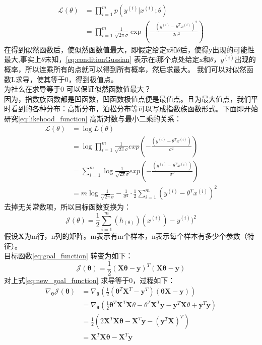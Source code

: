 \documentclass{ctexart}
\begin{document}
    \begin{align}\label{eq:likehood_function}
      \mathcal L(\theta) &= \prod_{i=1}^{m}p(y^{(i)}|x^{(i)};\theta)\\
      &=\prod_{i=1}^{m}\frac{1}{\sqrt{2\pi}{\sigma}}\exp\left(-\frac{(y^{(i)}-\theta^Tx^{(i)})^2}{2\sigma^2}\right)
    \end{align}
    在得到似然函数后，使似然函数值最大，即假定给定x和$ \theta $后，使得y出现的可能性最大,事实上$\theta $未知，\ref{eq:conditionGussian} 表示在i那个点处给定x和$\theta ，y^{(i)}$出现的概率，所以连乘所有的点就可以得到所有概率，然后求最大。 我们可以对似然函数L求导，使其等于0，得到极值点。 \\
    为社么在求导等于0 可以保证似然函数值最大？ \\
    因为，指数族函数都是凹函数，凹函数极值点便是最值点。且为最大值点，我们平时看到的各种分布：高斯分布，泊松分布等可以写成指数族函数形式。下面即开始研究\ref{eq:likehood_function} 高斯对数与最小二乘的关系： \\
    \begin{align}\label{eq:log_likehood}
      \mathcal L(\theta) & = \log L(\theta) \\
      & = \log \prod_{i=1}^{m}\frac{1}{\sqrt{2\pi}\sigma}exp\left ( -\frac{(y^{(i)}-\theta^Tx^{(i)})}{\sigma^2}\right )\\
      & = \sum_{i=1}^{m}\log \frac{1}{\sqrt{2\pi}\sigma}exp\left ( -\frac{(y^{(i)}-\theta^Tx^{(i)})}{\sigma^2}\right ) \\
      & = m\log \frac{1}{\sqrt{2\pi}\sigma}-\frac{1}{\sigma^2}\cdot\frac{1}{2}\sum_{i=1}^{m}(y^{(i)}-\theta^Tx^{(i)})^2
    \end{align}
    去掉无关常数项，所以目标函数变换为：\\
    \begin{equation}\label{eq:goal_function}
      \mathcal{J(\theta)} = \frac{1}{2}\sum_{i=1}^{m}(h_(\theta))(x^{(i)})-y^{(i)})^2
    \end{equation}
    假设$\bm X$为m行，n列的矩阵。m表示有m个样本，n表示每个样本有多少个参数（特征）。\\
    目标函数\ref{eq:goal_function} 转变为如下：
    \begin{equation}\label{eq:new_goal_function}
      \mathcal{J(\bm\theta)} =\frac{1}{2}(\bm X\bm\theta - \bm y)^T(\bm X\bm\theta - \bm y)
    \end{equation}
    对上式\ref{eq:new_goal_function} 求导等于0，过程如下：
    \begin{align}
    \label{qiudao_newgoal}
      \nabla_{\bm\theta} \mathcal J(\bm\theta) & = \nabla_{\bm\theta} \left ( \frac{1}{2}(\bm\theta^T\bm X^T - \bm y^T)(\bm\theta\bm X -\bm y) \right ) \\
     & = \nabla_{\bm\theta}\left (\frac{1}{2}\bm\theta^T\bm X^T\bm X\theta-\theta^T\bm X^T\bm y - \bm y^T\bm X\theta +\bm y^T\bm y \right ) \\
     & = \frac{1}{2}\left (2\bm X^T\bm X\bm\theta-\bm X^T\bm y -(\bm y^T\bm X)^T\right ) \\
     & = \bm X^T\bm X\bm\theta - \bm X^T\bm y
    \end{align}
\end{document}
